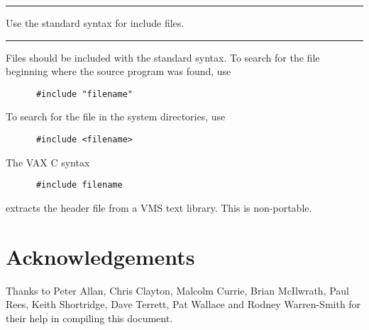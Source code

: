 \documentclass[twoside,11pt]{article}
\newcounter{sruleno}
\newcommand{\srule}[1]{
    \addtocounter{sruleno}{1}
    \goodbreak
    \rule[0.5ex]{\textwidth}{0.3mm}
    {\Large #1 \hfill {\thesruleno}}
    \rule[0.5ex]{\textwidth}{0.1mm}
}
\newcommand{\srule}[1]{
       \addtocounter{sruleno}{1}
       \begin{rawhtml} <HR> \end{rawhtml}
       {\Large \thesruleno}~~~~{\Large #1}
       \begin{rawhtml} <HR> \end{rawhtml}
       \end{tabular}
  }
\begin{document}
\srule{Use the standard syntax for include files.}
Files should be included with the standard syntax.  To search for the file 
beginning where the source program was found, use
\begin{verbatim}
      #include "filename"
\end{verbatim}
 
To search for the file in the system directories, use
\begin{verbatim}
      #include <filename>
\end{verbatim}

The VAX C syntax 
\begin{verbatim}
      #include filename
\end{verbatim}
extracts the header file from a VMS text library. This is non-portable.


\section{Acknowledgements}

Thanks to Peter Allan, Chris Clayton, Malcolm Currie, Brian McIlwrath, Paul 
Rees, Keith Shortridge, Dave Terrett, Pat Wallace and 
Rodney Warren-Smith for their help in compiling this document.
\end{document}
